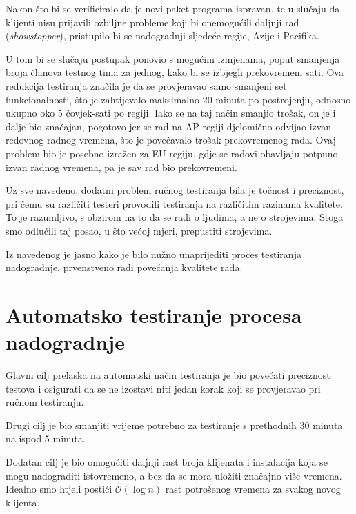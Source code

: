 Nakon što bi se verificiralo da je novi paket programa ispravan, te u slučaju da klijenti nisu prijavili ozbiljne probleme koji bi onemogućili daljnji rad (\emph{showstopper}), pristupilo bi se nadogradnji sljedeće regije, Azije i Pacifika.

U tom bi se slučaju postupak ponovio s mogućim izmjenama, poput smanjenja broja članova testnog tima za jednog, kako bi se izbjegli prekovremeni sati.
Ova redukcija testiranja značila je da se provjeravao samo smanjeni set funkcionalnosti, što je zahtijevalo maksimalno 20 minuta po postrojenju, odnosno ukupno oko 5 čovjek-sati po regiji.
Iako se na taj način smanjio trošak, on je i dalje bio značajan, pogotovo jer se rad na AP regiji djelomično odvijao izvan redovnog radnog vremena, što je povećavalo trošak prekovremenog rada.
Ovaj problem bio je posebno izražen za EU regiju, gdje se radovi obavljaju potpuno izvan radnog vremena, pa je sav rad bio prekovremeni.

Uz sve navedeno, dodatni problem ručnog testiranja bila je točnost i preciznost, pri čemu su različiti testeri provodili testiranja na različitim razinama kvalitete.
To je razumljivo, s obzirom na to da se radi o ljudima, a ne o strojevima.
Stoga smo odlučili taj posao, u što većoj mjeri, prepustiti strojevima.

Iz navedenog je jasno kako je bilo nužno unaprijediti proces testiranja nadogradnje, prvenstveno radi povećanja kvalitete rada.

\section{Automatsko testiranje procesa nadogradnje}

Glavni cilj prelaska na automatski način testiranja je bio povećati preciznost testova i osigurati da se ne izostavi niti jedan korak koji se provjeravao pri ručnom testiranju.

Drugi cilj je bio smanjiti vrijeme potrebno za testiranje s prethodnih 30 minuta na ispod 5 minuta.

Dodatan cilj je bio omogućiti daljnji rast broja klijenata i instalacija koja se mogu nadograditi istovremeno, a bez da se mora uložiti značajno više vremena.
Idealno smo htjeli postići $\mathcal{O}(\log n)$ rast potrošenog vremena za svakog novog klijenta.

